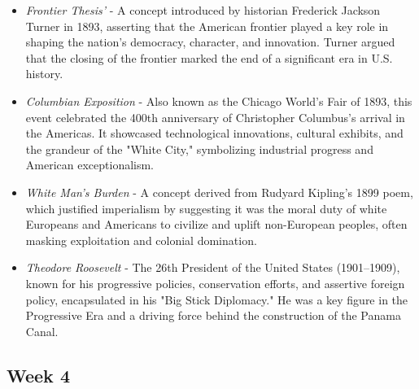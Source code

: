 \documentclass[12pt]{article}
\begin{document}
\begin{itemize}
    \item \textit{Frontier Thesis’} - A concept introduced by historian Frederick Jackson Turner in 1893, asserting that the American frontier played a key role in shaping the nation's democracy, character, and innovation. Turner argued that the closing of the frontier marked the end of a significant era in U.S. history.
    
    \item \textit{Columbian Exposition} - Also known as the Chicago World's Fair of 1893, this event celebrated the 400th anniversary of Christopher Columbus's arrival in the Americas. It showcased technological innovations, cultural exhibits, and the grandeur of the "White City," symbolizing industrial progress and American exceptionalism.
    
    \item \textit{White Man’s Burden} - A concept derived from Rudyard Kipling’s 1899 poem, which justified imperialism by suggesting it was the moral duty of white Europeans and Americans to civilize and uplift non-European peoples, often masking exploitation and colonial domination.
    
    \item \textit{Theodore Roosevelt} - The 26th President of the United States (1901–1909), known for his progressive policies, conservation efforts, and assertive foreign policy, encapsulated in his "Big Stick Diplomacy." He was a key figure in the Progressive Era and a driving force behind the construction of the Panama Canal.
\end{itemize}

\subsection*{Week 4}
\end{document}
